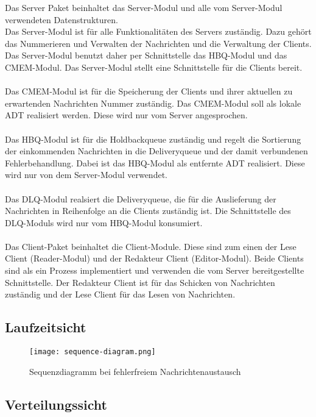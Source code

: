 \documentclass{article}
\begin{document}
Das Server Paket beinhaltet das Server-Modul und alle vom Server-Modul verwendeten Datenstrukturen.\\
Das Server-Modul ist für alle Funktionalitäten des Servers zuständig. Dazu gehört das Nummerieren und Verwalten der Nachrichten und die Verwaltung der Clients.\\
Das Server-Modul benutzt daher per Schnittstelle das HBQ-Modul und das CMEM-Modul. Das Server-Modul stellt eine Schnittstelle für die Clients bereit.\\
\\
Das CMEM-Modul ist für die Speicherung der Clients und ihrer aktuellen zu erwartenden Nachrichten Nummer zuständig. Das CMEM-Modul soll als lokale ADT realisiert werden. Diese wird nur vom Server angesprochen.\\
\\
Das HBQ-Modul ist für die Holdbackqueue zuständig und regelt die Sortierung der einkommenden Nachrichten in die Deliveryqueue und der damit verbundenen Fehlerbehandlung. Dabei ist das HBQ-Modul als entfernte ADT realisiert. Diese wird nur von dem Server-Modul verwendet.\\
\\
Das DLQ-Modul realsiert die Deliveryqueue, die für die Auslieferung der Nachrichten in Reihenfolge an die Clients zuständig ist. Die Schnittstelle des DLQ-Moduls wird nur vom HBQ-Modul konsumiert.\\
\\
Das Client-Paket beinhaltet die Client-Module. Diese sind zum einen der Lese Client (Reader-Modul) und der Redakteur Client (Editor-Modul). Beide Clients sind als ein Prozess implementiert und verwenden die vom Server bereitgestellte Schnittstelle. Der Redakteur Client ist für das Schicken von Nachrichten zuständig und der Lese Client für das Lesen von Nachrichten.

\subsection{Laufzeitsicht}
\begin{figure}[H]
\centering
\texttt{[image: sequence-diagram.png]}
\caption[seq-dia]{Sequenzdiagramm bei fehlerfreiem Nachrichtenaustausch}
\label{fig:sequence-diagram}
\end{figure}

\subsection{Verteilungssicht}
\end{document}
